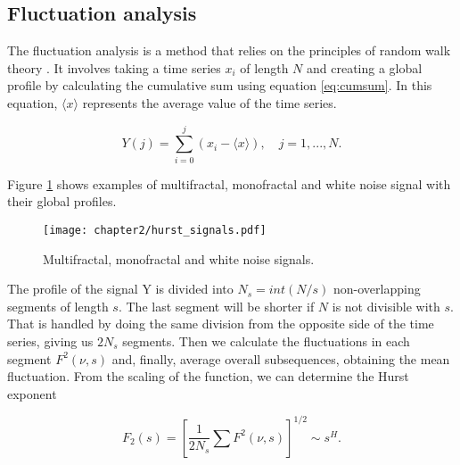 
\subsection{Fluctuation analysis}

The fluctuation analysis is a method that relies on the principles of random walk theory \cite{kantelhardt2008fractal}. It involves taking a time series ${x_i}$ of length $N$ and creating a global profile by calculating the cumulative sum using equation \ref{eq:cumsum}. In this equation, $\langle x\rangle $ represents the average value of the time series.


\begin{equation}
Y(j) = \sum_{i=0} ^j (x_i - \langle x\rangle), \quad j=1, ..., N .
\label{eq:cumsum}
\end{equation}

Figure \ref{fig:hurst_signals} shows examples of multifractal, monofractal and white noise signal with their global profiles.

\begin{figure}[h]
	\centering
	\texttt{[image: chapter2/hurst\_signals.pdf]}
	\caption{Multifractal, monofractal and white noise signals.}
	\label{fig:hurst_signals}
\end{figure}

The profile of the signal Y is divided into $N_s = int (N/s)$ non-overlapping segments of length $s$. The last segment will be shorter if $N$ is not divisible with $s$. That is handled by doing the same division from the opposite side of the time series, giving us $2N_s$ segments. Then we calculate the fluctuations in each segment $F^2(\nu, s)$ and, finally, average overall subsequences, obtaining the mean fluctuation. From the scaling of the function, we can determine the Hurst exponent

\begin{equation}
F_2(s) = [\frac{1}{2N_s} \sum F^2(\nu,s)]^{1/2}  \sim s^H.
\end{equation} 

